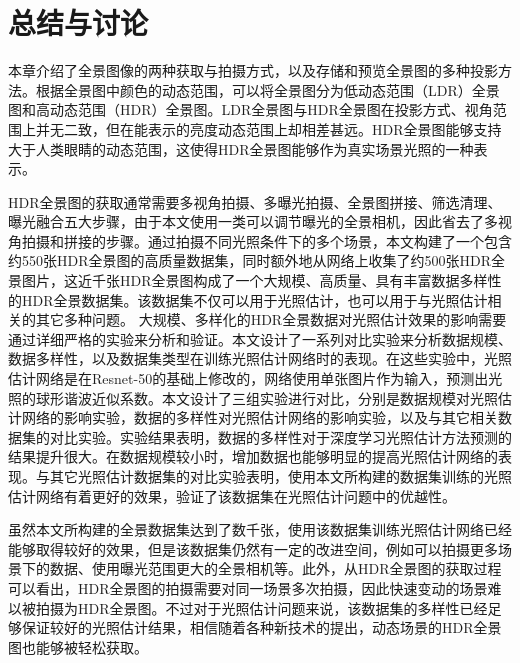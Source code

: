 \section{总结与讨论}
本章介绍了全景图像的两种获取与拍摄方式，以及存储和预览全景图的多种投影方法。根据全景图中颜色的动态范围，可以将全景图分为低动态范围（LDR）全景图和高动态范围（HDR）全景图。LDR全景图与HDR全景图在投影方式、视角范围上并无二致，但在能表示的亮度动态范围上却相差甚远。HDR全景图能够支持大于人类眼睛的动态范围，这使得HDR全景图能够作为真实场景光照的一种表示。

HDR全景图的获取通常需要多视角拍摄、多曝光拍摄、全景图拼接、筛选清理、曝光融合五大步骤，由于本文使用一类可以调节曝光的全景相机，因此省去了多视角拍摄和拼接的步骤。通过拍摄不同光照条件下的多个场景，本文构建了一个包含约550张HDR全景图的高质量数据集，同时额外地从网络上收集了约500张HDR全景图片，这近千张HDR全景图构成了一个大规模、高质量、具有丰富数据多样性的HDR全景数据集。该数据集不仅可以用于光照估计，也可以用于与光照估计相关的其它多种问题。
大规模、多样化的HDR全景数据对光照估计效果的影响需要通过详细严格的实验来分析和验证。本文设计了一系列对比实验来分析数据规模、数据多样性，以及数据集类型在训练光照估计网络时的表现。在这些实验中，光照估计网络是在Resnet-50的基础上修改的，网络使用单张图片作为输入，预测出光照的球形谐波近似系数。本文设计了三组实验进行对比，分别是数据规模对光照估计网络的影响实验，数据的多样性对光照估计网络的影响实验，以及与其它相关数据集的对比实验。实验结果表明，数据的多样性对于深度学习光照估计方法预测的结果提升很大。在数据规模较小时，增加数据也能够明显的提高光照估计网络的表现。与其它光照估计数据集的对比实验表明，使用本文所构建的数据集训练的光照估计网络有着更好的效果，验证了该数据集在光照估计问题中的优越性。

虽然本文所构建的全景数据集达到了数千张，使用该数据集训练光照估计网络已经能够取得较好的效果，但是该数据集仍然有一定的改进空间，例如可以拍摄更多场景下的数据、使用曝光范围更大的全景相机等。此外，从HDR全景图的获取过程可以看出，HDR全景图的拍摄需要对同一场景多次拍摄，因此快速变动的场景难以被拍摄为HDR全景图。不过对于光照估计问题来说，该数据集的多样性已经足够保证较好的光照估计结果，相信随着各种新技术的提出，动态场景的HDR全景图也能够被轻松获取。
